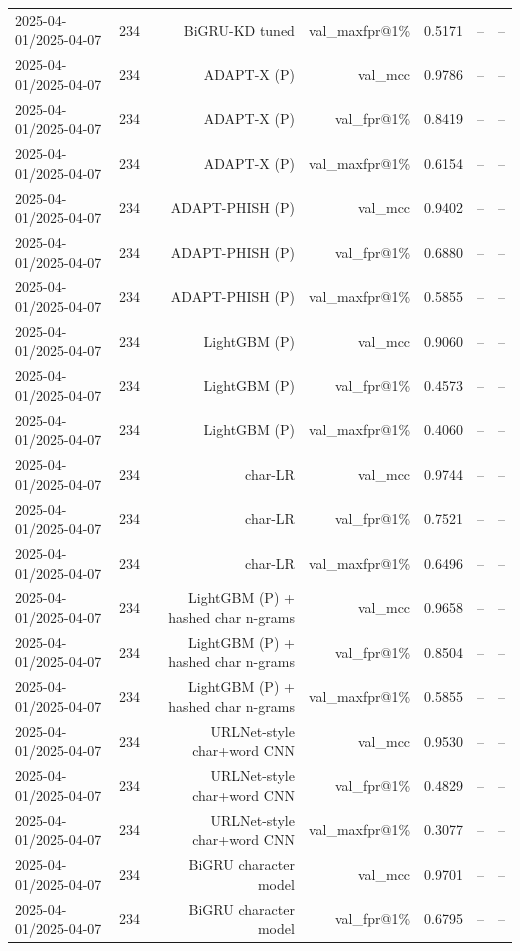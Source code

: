 \begin{table}[t]
\begin{tabular}{llrrrrr}
2025-04-01/2025-04-07 & 234 & BiGRU-KD tuned & val\_maxfpr@1\% & 0.5171 & -- & -- \\
2025-04-01/2025-04-07 & 234 & ADAPT-X (P) & val\_mcc & 0.9786 & -- & -- \\
2025-04-01/2025-04-07 & 234 & ADAPT-X (P) & val\_fpr@1\% & 0.8419 & -- & -- \\
2025-04-01/2025-04-07 & 234 & ADAPT-X (P) & val\_maxfpr@1\% & 0.6154 & -- & -- \\
2025-04-01/2025-04-07 & 234 & ADAPT-PHISH (P) & val\_mcc & 0.9402 & -- & -- \\
2025-04-01/2025-04-07 & 234 & ADAPT-PHISH (P) & val\_fpr@1\% & 0.6880 & -- & -- \\
2025-04-01/2025-04-07 & 234 & ADAPT-PHISH (P) & val\_maxfpr@1\% & 0.5855 & -- & -- \\
2025-04-01/2025-04-07 & 234 & LightGBM (P) & val\_mcc & 0.9060 & -- & -- \\
2025-04-01/2025-04-07 & 234 & LightGBM (P) & val\_fpr@1\% & 0.4573 & -- & -- \\
2025-04-01/2025-04-07 & 234 & LightGBM (P) & val\_maxfpr@1\% & 0.4060 & -- & -- \\
2025-04-01/2025-04-07 & 234 & char-LR & val\_mcc & 0.9744 & -- & -- \\
2025-04-01/2025-04-07 & 234 & char-LR & val\_fpr@1\% & 0.7521 & -- & -- \\
2025-04-01/2025-04-07 & 234 & char-LR & val\_maxfpr@1\% & 0.6496 & -- & -- \\
2025-04-01/2025-04-07 & 234 & LightGBM (P) + hashed char n-grams & val\_mcc & 0.9658 & -- & -- \\
2025-04-01/2025-04-07 & 234 & LightGBM (P) + hashed char n-grams & val\_fpr@1\% & 0.8504 & -- & -- \\
2025-04-01/2025-04-07 & 234 & LightGBM (P) + hashed char n-grams & val\_maxfpr@1\% & 0.5855 & -- & -- \\
2025-04-01/2025-04-07 & 234 & URLNet-style char+word CNN & val\_mcc & 0.9530 & -- & -- \\
2025-04-01/2025-04-07 & 234 & URLNet-style char+word CNN & val\_fpr@1\% & 0.4829 & -- & -- \\
2025-04-01/2025-04-07 & 234 & URLNet-style char+word CNN & val\_maxfpr@1\% & 0.3077 & -- & -- \\
2025-04-01/2025-04-07 & 234 & BiGRU character model & val\_mcc & 0.9701 & -- & -- \\
2025-04-01/2025-04-07 & 234 & BiGRU character model & val\_fpr@1\% & 0.6795 & -- & -- \\

\end{tabular}
\end{table}
